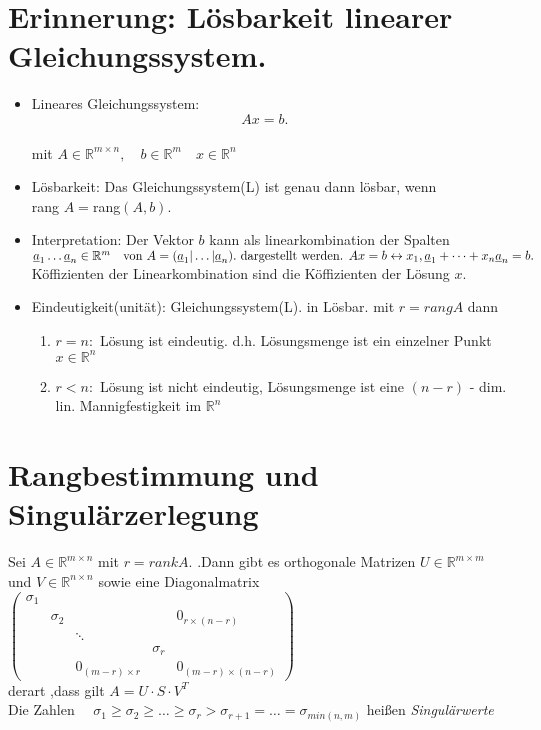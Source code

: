 \documentclass[ngerman]{tudscrreprt}
\begin{document}
\section{Erinnerung: Lösbarkeit linearer Gleichungssystem.}%
\label{Sec:Loesbarkeit.lin.Gleichungssystem}
\begin{itemize}
\item Lineares Gleichungssystem: \begin{equation*}Ax=b.\quad \tag{L} \end{equation*}\\
mit $A \in \mathbb{R}^{m\times n}, \quad b \in \mathbb{R}^m \quad x\in \mathbb{R}^n$\\
\item Lösbarkeit: Das Gleichungssystem(L) ist genau dann lösbar, wenn \\
rang $A = $rang$(A,b)$.\\ 

\item Interpretation: Der Vektor $b$ kann als linearkombination der Spalten \\$\underline{a}_1 \dots \underline{a}_n \in \mathbb{R}^m \quad \text{von } A=(\underline{a}_1 | \dots | \underline{a}_n). \text{  dargestellt werden.  } \\ Ax=b \leftrightarrow x_1, \underline{a}_1 + \dots + x_n \underline{a}_n = b.$ \\
Köffizienten der Linearkombination sind die Köffizienten der Lösung $x$.\\

\item Eindeutigkeit(unität): Gleichungssystem(L). in Lösbar. mit $r=rang A$ dann 
\begin{enumerate}
\item $r=n:$ Lösung ist eindeutig. d.h. Lösungsmenge ist ein einzelner Punkt $x\in \mathbb{R}^n$
\item $r<n:$ Lösung ist nicht eindeutig, Lösungsmenge ist eine $(n-r)$ - dim. lin. Mannigfestigkeit im $\mathbb{R}^n$ 
\end{enumerate}
\end{itemize}
\section{Rangbestimmung und Singul\"arzerlegung}
Sei $A \in \mathbb{R}^{m\times n}$ mit $r=rank A.$ .Dann gibt es orthogonale Matrizen $U \in \mathbb{R}^{m\times m}$ und $V \in \mathbb{R}^{n\times n}$ sowie eine Diagonalmatrix 
$ 
\begin{pmatrix}
\sigma_1&         &        &   &\\
        &\sigma_2 &        &   &0_{r\times (n-r)}\\
        &         & \ddots &   &\\
        &         &        &\sigma_r&\\
&&0_{(m-r)\times r }& & 0_{(m-r)\times (n-r)}
 
\end{pmatrix}
$
\\
derart ,dass gilt $ A = U \cdot S \cdot V^T$ \\
Die Zahlen
$\quad \sigma_1 \geq \sigma_2 \geq \dots \geq \sigma_r > \sigma_{r+1} = \dots= \sigma_{min(n,m)} $ heißen \textit{Singulärwerte}
\end{document}
